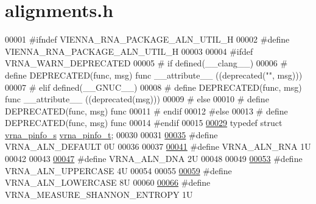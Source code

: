 \hypertarget{utils_2alignments_8h_source}{}\section{alignments.\+h}
\label{utils_2alignments_8h_source}

\begin{DoxyCode}
00001 \textcolor{preprocessor}{#ifndef VIENNA\_RNA\_PACKAGE\_ALN\_UTIL\_H}
00002 \textcolor{preprocessor}{#define VIENNA\_RNA\_PACKAGE\_ALN\_UTIL\_H}
00003 
00004 \textcolor{preprocessor}{#ifdef VRNA\_WARN\_DEPRECATED}
00005 \textcolor{preprocessor}{# if defined(\_\_clang\_\_)}
00006 \textcolor{preprocessor}{#  define DEPRECATED(func, msg) func \_\_attribute\_\_ ((deprecated("", msg)))}
00007 \textcolor{preprocessor}{# elif defined(\_\_GNUC\_\_)}
00008 \textcolor{preprocessor}{#  define DEPRECATED(func, msg) func \_\_attribute\_\_ ((deprecated(msg)))}
00009 \textcolor{preprocessor}{# else}
00010 \textcolor{preprocessor}{#  define DEPRECATED(func, msg) func}
00011 \textcolor{preprocessor}{# endif}
00012 \textcolor{preprocessor}{#else}
00013 \textcolor{preprocessor}{# define DEPRECATED(func, msg) func}
00014 \textcolor{preprocessor}{#endif}
00015 
\hyperlink{group__aln__utils_ga6660dfca23debee7306e0cd53341263f}{00029} \textcolor{keyword}{typedef} \textcolor{keyword}{struct }\hyperlink{group__aln__utils_structvrna__pinfo__s}{vrna\_pinfo\_s} \hyperlink{group__aln__utils_structvrna__pinfo__s}{vrna\_pinfo\_t};
00030 
00031 
\hyperlink{group__aln__utils_ga7437bcbc3142b266f1f3b086eb669092}{00035} \textcolor{preprocessor}{#define VRNA\_ALN\_DEFAULT      0U}
00036 
00037 
\hyperlink{group__aln__utils_ga1a2aa60bcc51dc8e48c07bf146bd28c1}{00041} \textcolor{preprocessor}{#define VRNA\_ALN\_RNA          1U}
00042 
00043 
\hyperlink{group__aln__utils_ga36affc310a5adedf1bdbf9669dd4bf85}{00047} \textcolor{preprocessor}{#define VRNA\_ALN\_DNA          2U}
00048 
00049 
\hyperlink{group__aln__utils_ga0de72fc917d72acafe862750a3a5e0bc}{00053} \textcolor{preprocessor}{#define VRNA\_ALN\_UPPERCASE    4U}
00054 
00055 
\hyperlink{group__aln__utils_ga27eb303be3c8368c9e8be76a4d6ca35e}{00059} \textcolor{preprocessor}{#define VRNA\_ALN\_LOWERCASE    8U}
00060 
\hyperlink{group__aln__utils_ga1e659227c9fc077d29989f576f129000}{00066} \textcolor{preprocessor}{#define VRNA\_MEASURE\_SHANNON\_ENTROPY  1U}

\end{DoxyCode}

